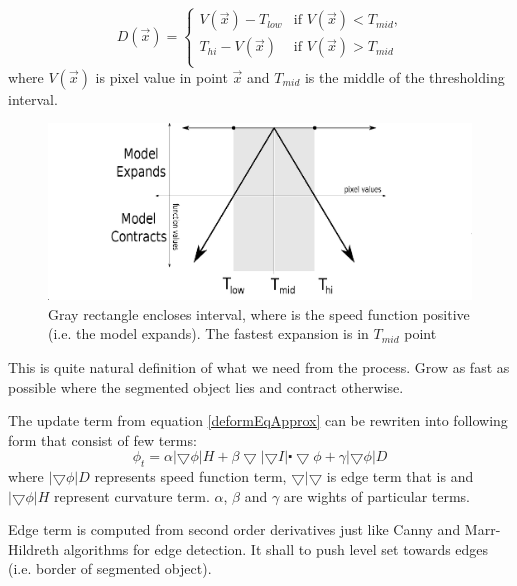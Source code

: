 \begin{equation}
D(\vec{x}) = 
\begin{cases}
V(\vec{x}) - T_{low} & \text{if $V(\vec{x}) < T_{mid}$,}\\
T_{hi} - V(\vec{x}) & \text{if $V(\vec{x}) > T_{mid}$}\\
\end{cases}
\end{equation}
where $V(\vec{x})$ is pixel value in point $\vec{x}$ and $T_{mid}$ is the middle of the thresholding interval.

\begin{figure}
    \centering
    \includegraphics[width=14cm]{data/speedFunction.eps}
    \caption[Graph of thresholding based speed function]{Gray rectangle encloses interval, where is the speed function positive (i.e. the model expands). The fastest expansion is in $T_{mid}$ point}
    \label{fg:speedFunction}
\end{figure}

This is quite natural definition of what we need from the process. Grow as fast as possible where the segmented object lies and contract otherwise.

The update term from equation \ref{deformEqApprox} can be rewriten into following form that consist of few terms:
\begin{equation}
\phi_t = \alpha |\bigtriangledown \phi| H + \beta \bigtriangledown|\bigtriangledown I|\centerdot \bigtriangledown \phi + \gamma|\bigtriangledown \phi|D
\end{equation}
where $|\bigtriangledown \phi|D$ represents speed function term, $\bigtriangledown|\bigtriangledown$ is edge term that is and $|\bigtriangledown \phi| H$ represent curvature term. $\alpha$, $\beta$ and $\gamma$ are wights of particular terms.

Edge term is computed from second order derivatives just like Canny and Marr-Hildreth algorithms for edge detection. It shall to push level set towards edges (i.e. border of segmented object).

